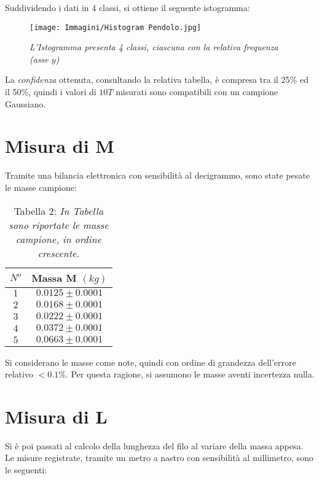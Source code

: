 \documentclass[12pt, a4paper]{article}
\begin{document}
\newpage

Suddividendo i dati in 4 classi, si ottiene il seguente istogramma:
\bigskip

    \begin{figure}[h!]
\centering
\texttt{[image: Immagini/Histogram Pendolo.jpg]}
\caption{\textit{{\footnotesize{L'Istogramma presenta 4 classi, ciascuna con la relativa frequenza (asse $y$) }}}}
\label{Grafico parabolico}
\end{figure}


\bigskip
\addvspace{1.5cm}
La \textit{confidenza} ottenuta, consultando la relativa tabella, è compresa tra il 25\% ed il 50\%, quindi i valori di $10T$ misurati sono compatibili con un campione Gaussiano.

\newpage

\section{Misura di M}
Tramite una bilancia elettronica con sensibilità al decigrammo, sono state pesate le masse campione:

\begin{table}[!htb]
    \centering
        \begin{tabular}{|c|c|}
            \hline
            $N^o$ &Massa M $(kg)$\\
            \hline
            $1$ & $0.0125\pm0.0001$\\
            $2$ & $0.0168\pm0.0001$\\
            $3$ & $0.0222\pm0.0001$\\
            $4$ & $0.0372\pm0.0001$\\
            $5$ & $0.0663\pm0.0001$\\
            \hline
        \end{tabular}
        \label{Tab masse}
        \caption*{Tabella 2: \textit{\footnotesize In Tabella sono riportate le masse campione, in ordine crescente.}}
        \end{table}

    Si considerano le masse come note, quindi con ordine di grandezza dell'errore relativo $<0.1\%$. Per questa ragione, si assumono le masse aventi incertezza nulla.


    
\section{Misura di L}
\label{Misura di L}
Si è poi passati al calcolo della lunghezza del filo al variare della massa appesa. Le misure registrate, tramite un metro a nastro con sensibilità al millimetro, sono le seguenti:
\end{document}
